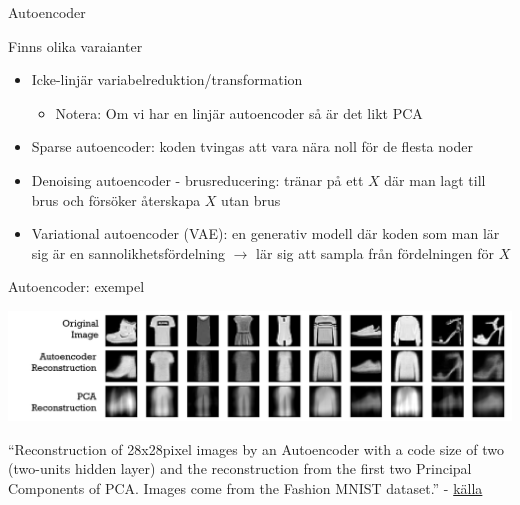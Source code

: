 \documentclass[10pt,english]{beamer}
\begin{document}
\begin{frame}{Autoencoder}
    
    Finns olika varaianter
    \begin{itemize}
      \item Icke-linjär variabelreduktion/transformation
      \begin{itemize}
        \item Notera: Om vi har en linjär autoencoder så är det likt PCA
      \end{itemize}
      \item Sparse autoencoder: koden tvingas att vara nära noll för de flesta noder
      \item Denoising autoencoder - brusreducering: tränar på ett $X$ där man lagt till brus och försöker återskapa $X$ utan brus
      \item Variational autoencoder (VAE): en generativ modell där koden som man lär sig är en sannolikhetsfördelning $\rightarrow$ lär sig att sampla från fördelningen för $X$
    \end{itemize}
    
\end{frame} 
     

\begin{frame}{Autoencoder: exempel}
    
    
    \includegraphics[scale=0.32]{figs/Reconstruction_autoencoders_vs_PCA.png}
    
    ``Reconstruction of 28x28pixel images by an Autoencoder with a code size of two (two-units hidden layer) and the reconstruction from the first two Principal Components of PCA. Images come from the Fashion MNIST dataset.''  - \href{https://en.wikipedia.org/wiki/Autoencoder\#Principal_component_analysis}{källa}

\end{frame}
\end{document}
